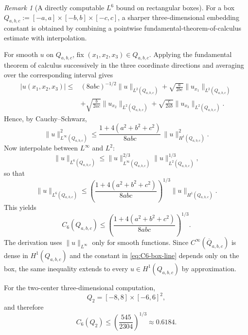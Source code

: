 \documentclass[11pt]{article}
\theoremstyle{plain}
\theoremstyle{definition}
\theoremstyle{remark}
\newtheorem{remark}{Remark}
\begin{document}
\begin{remark}[A directly computable $L^6$ bound on rectangular boxes]
\label{rmk:c6-boxes}
For a box $Q_{a,b,c}:=[-a,a]\times[-b,b]\times[-c,c]$, a sharper three-dimensional
embedding constant is obtained by combining a pointwise
fundamental-theorem-of-calculus estimate with interpolation.

For smooth $u$ on $Q_{a,b,c}$, fix $(x_1,x_2,x_3)\in Q_{a,b,c}$. Applying the
fundamental theorem of calculus successively in the three coordinate
directions and averaging over the corresponding interval gives
%
\begin{align*}
  |u(x_1,x_2,x_3)|
  \le{}&
  (8abc)^{-1/2}\|u\|_{L^2(Q_{a,b,c})}
  + \sqrt{\frac{a}{2bc}}\|u_{x_1}\|_{L^2(Q_{a,b,c})}\\
  &+ \sqrt{\frac{b}{2ac}}\|u_{x_2}\|_{L^2(Q_{a,b,c})}
  + \sqrt{\frac{c}{2ab}}\|u_{x_3}\|_{L^2(Q_{a,b,c})}.
\end{align*}
Hence, by Cauchy--Schwarz,
\[
\|u\|_{L^\infty(Q_{a,b,c})}^2
\le
\frac{1+4(a^2+b^2+c^2)}{8abc}\,
\|u\|_{H^1(Q_{a,b,c})}^2.
\]
Now interpolate between $L^\infty$ and $L^2$:
\[
\|u\|_{L^6(Q_{a,b,c})}
\le
\|u\|_{L^\infty(Q_{a,b,c})}^{2/3}
\|u\|_{L^2(Q_{a,b,c})}^{1/3},
\]
so that
\[
  \|u\|_{L^6(Q_{a,b,c})}
  \le
  \left(
    \frac{1+4(a^2+b^2+c^2)}{8abc}
  \right)^{1/3}
  \|u\|_{H^1(Q_{a,b,c})}.
\]
This yields
\begin{equation}
C_6(Q_{a,b,c})
\le
\left(\frac{1+4(a^2+b^2+c^2)}{8abc}\right)^{1/3}.
\label{eq:C6-box-line}
\end{equation}
The derivation uses $\|u\|_{L^\infty}$ only for smooth functions. Since
$C^\infty(\overline Q_{a,b,c})$ is dense in $H^1(Q_{a,b,c})$ and the constant
in \eqref{eq:C6-box-line} depends only on the box, the same inequality extends
to every $u\in H^1(Q_{a,b,c})$ by approximation.

For the two-center three-dimensional computation,
\[
Q_2=[-8,8]\times[-6,6]^2,
\]
and therefore
\[
C_6(Q_2)\le \left(\frac{545}{2304}\right)^{1/3}\approx 0.6184.
\]
\end{remark}
\end{document}
